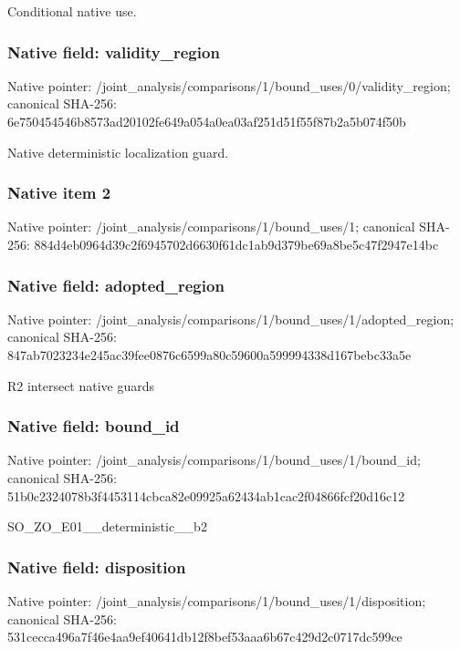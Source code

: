\documentclass[10pt,a4paper]{article}
\begin{document}
\begingroup\raggedright\sloppy Conditional native use.\par\endgroup

\subsubsection{Native field: validity\_\allowbreak{}region}
Native pointer: /joint\_\allowbreak{}analysis/comparisons/1/bound\_\allowbreak{}uses/0/validity\_\allowbreak{}region; canonical SHA-256: 6e750454546b8573ad20102fe649a054a0ea03af251d51f55f87b2a5b074f50b

\begingroup\raggedright\sloppy Native deterministic localization guard.\par\endgroup

\subsubsection{Native item 2}
Native pointer: /joint\_\allowbreak{}analysis/comparisons/1/bound\_\allowbreak{}uses/1; canonical SHA-256: 884d4eb0964d39c2f6945702d6630f61dc1ab9d379be69a8be5c47f2947e14bc

\subsubsection{Native field: adopted\_\allowbreak{}region}
Native pointer: /joint\_\allowbreak{}analysis/comparisons/1/bound\_\allowbreak{}uses/1/adopted\_\allowbreak{}region; canonical SHA-256: 847ab7023234e245ac39fee0876c6599a80c59600a599994338d167bebc33a5e

\begingroup\raggedright\sloppy R2 intersect native guards\par\endgroup

\subsubsection{Native field: bound\_\allowbreak{}id}
Native pointer: /joint\_\allowbreak{}analysis/comparisons/1/bound\_\allowbreak{}uses/1/bound\_\allowbreak{}id; canonical SHA-256: 51b0c2324078b3f4453114cbca82e09925a62434ab1cac2f04866fcf20d16c12

\begingroup\raggedright\sloppy SO\_\allowbreak{}ZO\_\allowbreak{}E01\_\allowbreak{}\_\allowbreak{}deterministic\_\allowbreak{}\_\allowbreak{}b2\par\endgroup

\subsubsection{Native field: disposition}
Native pointer: /joint\_\allowbreak{}analysis/comparisons/1/bound\_\allowbreak{}uses/1/disposition; canonical SHA-256: 531cecca496a7f46e4aa9ef40641db12f8bef53aaa6b67c429d2c0717dc599ce
\end{document}

